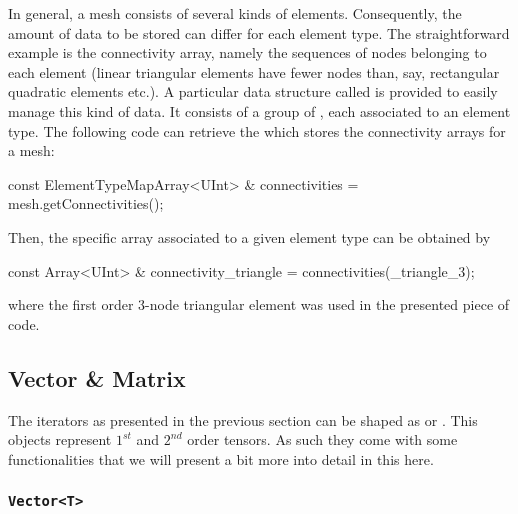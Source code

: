 In general, a mesh consists of several kinds of elements.
Consequently, the amount of data to be stored can differ for each
element type.  The straightforward example is the connectivity array,
namely the sequences of nodes belonging to each element (linear
triangular elements have fewer nodes than, say, rectangular quadratic
elements etc.).  A particular data structure called
 is provided to easily manage this kind of
data.  It consists of a group of , each associated to an
element type.  The following code can retrieve the
 which stores the connectivity arrays for a
mesh:
\begin{cpp}
  const ElementTypeMapArray<UInt> & connectivities = mesh.getConnectivities();
\end{cpp}
Then, the specific array associated to a given element type can be obtained by
\begin{cpp}
  const Array<UInt> & connectivity_triangle = connectivities(_triangle_3);
\end{cpp}
where the first order 3-node triangular element was used in the presented piece
of code.

\subsection{Vector \& Matrix}

The  iterators as presented in the previous section can be shaped as
 or . This objects represent $1^{st}$ and $2^{nd}$
order tensors. As such they come with some functionalities that we will present
a bit more into detail in this here.

\subsubsection{\texttt{Vector<T>}}

